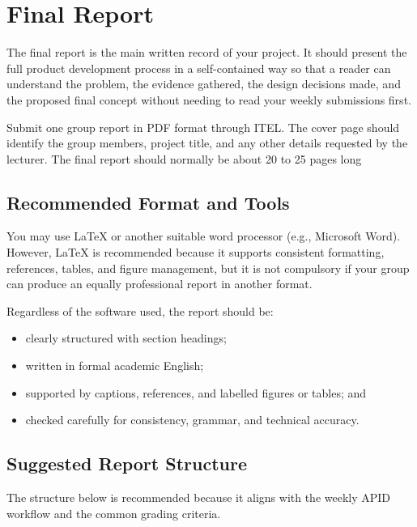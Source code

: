\section{Final Report}

The final report is the main written record of your project. It should present the full product development process in a self-contained way so that a reader can understand the problem, the evidence gathered, the design decisions made, and the proposed final concept without needing to read your weekly submissions first.

Submit one group report in PDF format through ITEL. The cover page should identify the group members, project title, and any other details requested by the lecturer. The final report should normally be about 20 to 25 pages long

\subsection{Recommended Format and Tools}

You may use \LaTeX{} or another suitable word processor (e.g., Microsoft Word). However, \LaTeX{} is recommended because it supports consistent formatting, references, tables, and figure management, but it is not compulsory if your group can produce an equally professional report in another format.

Regardless of the software used, the report should be:
\begin{itemize}
    \item clearly structured with section headings;
    \item written in formal academic English;
    \item supported by captions, references, and labelled figures or tables; and
    \item checked carefully for consistency, grammar, and technical accuracy.
\end{itemize}

\subsection{Suggested Report Structure}

The structure below is recommended because it aligns with the weekly APID workflow and the common grading criteria.


